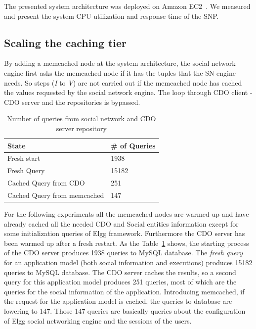 The presented system architecture was deployed on Amazon EC2~\cite{amazon_url}. We measured and present the system CPU utilization and response time of the SNP.

\subsection{Scaling the caching tier}
\label{sec:eval_memcache}
By adding a memcached node at the system architecture, the social network engine first asks the memcached node if it has the tuples that the SN engine needs. So steps (\emph{I} to \emph{V}) are not carried out if the memcached node has cached the values requested by the social network engine. The loop through CDO client - CDO server and the repositories is bypassed. 

\begin{table}[H]
\centering
\begin{tabular}{|l|l|}
\hline
State        & \# of Queries \\ \hline \hline
Fresh start  & 1938          \\ \hline
Fresh Query  & 15182         \\ \hline
Cached Query from CDO & 251           \\ \hline
Cached Query from memcached & 147 \\ \hline 
\end{tabular}
\caption{Number of queries from social network and CDO server repository}
\label{tab:num_of_queries}
\end{table} 

For the following experiments all the memcached nodes are warmed up and have already cached all the needed CDO and Social entities information except for some initialization queries of Elgg framework. Furthermore the CDO server has been warmed up after a fresh restart. As the Table~\ref{tab:num_of_queries} shows,
the starting process of the CDO server produces 1938 queries to MySQL database. The \emph{fresh query} for an application model (both social information and executions) produces 15182 queries to MySQL database. The CDO server caches the results, so a second query for this application model produces 251 queries, most of which are the queries for the social information of the application. Introducing memcached, if the request for the application model is cached, the queries to database are lowering to 147. Those 147 queries are basically queries about the configuration of Elgg social networking engine and the sessions of the users.

